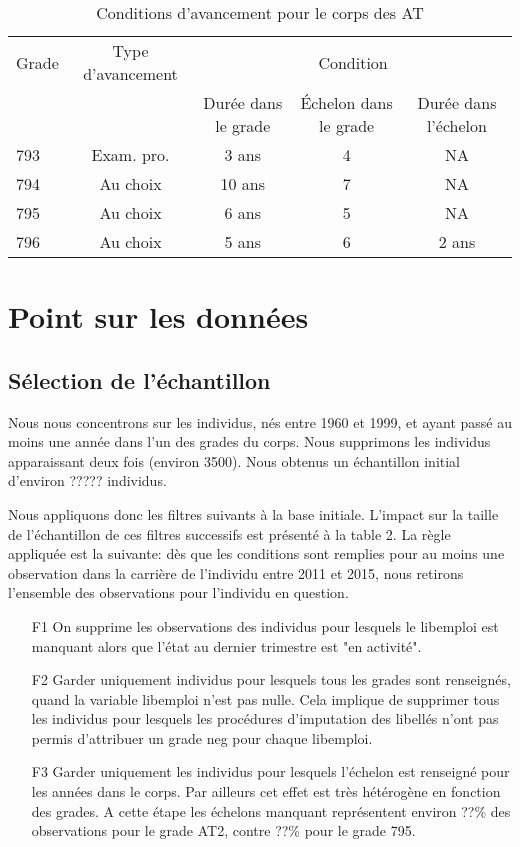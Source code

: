 \documentclass[11pt,a4paper]{article}
\begin{document}
\begin{table}[h!]
\label{means}
\centering
\caption{Conditions d'avancement pour le corps des AT} 
\begin{tabular}{l|c|ccc}
\toprule
 Grade  & Type d'avancement&  \multicolumn{3}{c}{Condition}  \\
		&  				   &  Durée dans le grade	&  Échelon	dans le grade & Durée dans l'échelon \\
\midrule
793  &	Exam. pro. 	&   3 ans  & 	4  & NA \\
794  &	Au choix 	& 	10 ans &	7  &	NA \\
795  & Au choix		& 	6 ans  &	5  &	NA \\
796 & Au choix		& 	5 ans  &	6  &	2 ans  \\	
%	
\bottomrule
\end{tabular}
\end{table}


\section{Point sur les données} \label{data}


\subsection{Sélection de l'échantillon}

Nous nous concentrons sur les individus, nés entre 1960 et 1999, et ayant passé au moins une année dans l'un des grades du corps. Nous supprimons les individus apparaissant deux fois (environ 3500). Nous obtenus un échantillon initial d'environ ????? individus. 

Nous appliquons donc les filtres suivants à la base initiale. L'impact sur la taille de l'échantillon de ces filtres successifs est présenté à la table 2. La règle appliquée est la suivante: dès que les conditions sont remplies pour au moins une observation dans la carrière de l'individu entre 2011 et 2015, nous retirons l'ensemble des observations pour l'individu en question. 
\begin{enumerate}[leftmargin=1cm ,parsep=0cm,itemsep=0cm,topsep=0cm] 
	\item[F1] On supprime les observations des individus pour lesquels le libemploi est manquant alors que l'état au dernier trimestre est "en activité". 
	\item[F2] Garder uniquement individus pour lesquels tous les grades sont renseignés, quand la variable libemploi n'est pas nulle. Cela implique de supprimer tous les individus pour lesquels les procédures d'imputation des libellés n'ont pas permis d'attribuer un grade neg pour chaque libemploi.
	\item[F3] Garder uniquement les individus pour lesquels l'échelon est renseigné pour les années dans le corps. Par ailleurs cet effet est très hétérogène en fonction des grades. A cette étape les échelons manquant représentent environ ??\% des observations pour le grade AT2, contre ??\% pour le grade 795.
\end{enumerate}
\end{document}
